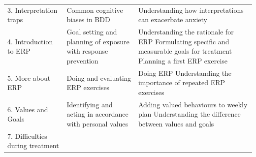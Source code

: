 \documentclass[]{book}
\theoremstyle{definition}
\theoremstyle{definition}
\theoremstyle{definition}
\theoremstyle{remark}
\begin{document}
\begin{longtable}[]{@{}lll@{}}
\begin{minipage}[t]{0.33\columnwidth}
3. Interpretation traps\strut
\end{minipage} & \begin{minipage}[t]{0.33\columnwidth}\raggedright
Common cognitive biases in BDD\strut
\end{minipage} & \begin{minipage}[t]{0.25\columnwidth}\raggedright
Understanding how interpretations can exacerbate anxiety\strut
\end{minipage}\tabularnewline
\begin{minipage}[t]{0.33\columnwidth}\raggedright
4. Introduction to ERP\strut
\end{minipage} & \begin{minipage}[t]{0.33\columnwidth}\raggedright
Goal setting and planning of exposure with response prevention\strut
\end{minipage} & \begin{minipage}[t]{0.25\columnwidth}\raggedright
Understanding the rationale for ERP Formulating specific and measurable
goals for treatment Planning a first ERP exercise\strut
\end{minipage}\tabularnewline
\begin{minipage}[t]{0.33\columnwidth}\raggedright
5. More about ERP\strut
\end{minipage} & \begin{minipage}[t]{0.33\columnwidth}\raggedright
Doing and evaluating ERP exercises\strut
\end{minipage} & \begin{minipage}[t]{0.25\columnwidth}\raggedright
Doing ERP Understanding the importance of repeated ERP exercises\strut
\end{minipage}\tabularnewline
\begin{minipage}[t]{0.33\columnwidth}\raggedright
6. Values and Goals\strut
\end{minipage} & \begin{minipage}[t]{0.33\columnwidth}\raggedright
Identifying and acting in accordance with personal values\strut
\end{minipage} & \begin{minipage}[t]{0.25\columnwidth}\raggedright
Adding valued behaviours to weekly plan Understanding the difference
between values and goals\strut
\end{minipage}\tabularnewline
\begin{minipage}[t]{0.33\columnwidth}\raggedright
7. Difficulties during treatment\strut
\end{minipage} & \begin{minipage}[t]{0.33\columnwidth}\raggedright

\end{minipage}
\end{longtable}
\end{document}
